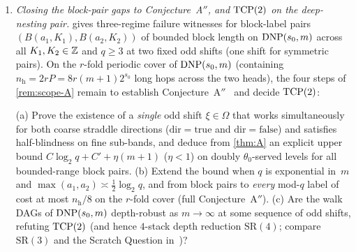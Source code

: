\begin{enumerate}[label=\arabic*.,leftmargin=2em]
\item \emph{Closing the block-pair gaps to Conjecture~A$''$, and $\mathrm{TCP}(2)$ on the deep-nesting pair.}  gives
  three-regime failure witnesses for block-label pairs $(B(a_1, K_1), B(a_2, K_2))$ of bounded block length on
  $\mathrm{DNP}(s_0, m)$ across all $K_1, K_2 \in \mathbb{Z}$ and $q \ge 3$ at two fixed odd shifts (one shift for symmetric pairs). On the
  $r$-fold periodic cover of $\mathrm{DNP}(s_0, m)$ (containing $n_{\mathrm{h}} = 2 r P = 8 r (m+1) 2^{s_0}$ long hops across the
  two heads), the four steps of \cref{rem:scope-A} remain to establish Conjecture~A$''$~\cite[Section~5.6, Conjecture~5.24]{EighthPaper2026}
  and decide $\mathrm{TCP}(2)$:
  \begin{problem}\label{prob:App-full}
  (a) Prove the existence of a \emph{single} odd shift $\xi \in \Omega$ that works simultaneously for both coarse straddle
  directions ($\mathrm{dir} = \mathrm{true}$ and $\mathrm{dir} = \mathrm{false}$) and satisfies half-blindness on fine
  sub-bands, and deduce from \cref{thm:A} an explicit upper bound $C\log_2 q + C' + \eta(m+1)$ ($\eta < 1$) on doubly
  $\theta_0$-served levels for all bounded-range block pairs.
  (b) Extend the bound when $q$ is exponential in~$m$ and $\max(a_1, a_2) \asymp \tfrac{1}{2}\log_2 q$, and from block pairs
  to \emph{every} mod-$q$ label of cost at most $n_{\mathrm{h}}/8$ on the $r$-fold cover (full Conjecture~A$''$).
  (c) Are the walk DAGs of $\mathrm{DNP}(s_0, m)$ depth-robust as $m \to \infty$ at some sequence of odd shifts, refuting $\mathrm{TCP}(2)$
  (and hence $4$-stack depth reduction $\mathrm{SR}(4)$; compare $\mathrm{SR}(3)$ and the Scratch Question
  in~\cite[Section~10, Problems~10.2 and~10.5]{EighthPaper2026})?
  \end{problem}
\end{enumerate}

